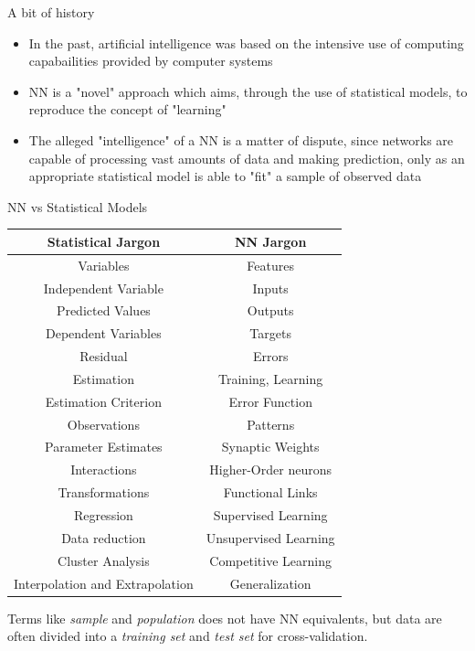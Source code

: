 \documentclass[xcolor ={table,usenames,dvipsnames}]{beamer}
\theoremstyle{definition}
\begin{document}
\begin{frame}{A bit of history}
\begin{itemize}
	\item In the past, artificial intelligence was based on the intensive use of computing capabailities provided by computer systems
	\item NN is a "novel" approach which aims, through the use of statistical models, to reproduce the concept of "learning"
	\item The alleged "intelligence" of a NN is a matter of dispute, since networks are capable of processing vast amounts of data and making prediction, only as an appropriate statistical model is able to "fit" a sample of observed data
\end{itemize}
\end{frame}
\begin{frame}{NN vs Statistical Models}
\tiny
	\begin{center}
	\begin{tabular}{|c|c|}
	\hline 
	\textbf{Statistical Jargon} & \textbf{NN Jargon} \\ 
	\hline 
	Variables & Features \\ 
	\hline 
	Independent Variable & Inputs \\ 
	\hline 
	Predicted Values & Outputs \\ 
	\hline 
	Dependent Variables & Targets \\ 
	\hline 
	Residual & Errors \\ 
	\hline 
	Estimation & Training, Learning \\ 
	\hline 
	Estimation Criterion & Error Function \\ 
	\hline 
	Observations & Patterns \\ 
	\hline 
	Parameter Estimates & Synaptic Weights \\ 
	\hline 
	Interactions & Higher-Order neurons \\ 
	\hline 
	Transformations & Functional Links \\ 
	\hline 
	Regression & Supervised Learning \\ 
	\hline 
	Data reduction & Unsupervised Learning \\ 
	\hline 
	Cluster Analysis & Competitive Learning \\ 
	\hline 
	Interpolation and Extrapolation & Generalization \\ 
	\hline 
\end{tabular}
\end{center}
\footnotesize
Terms like \emph{sample} and \emph{population} does not have NN equivalents, but data are often divided into a \emph{training set} and \emph{test set} for cross-validation.
\end{frame}
\end{document}
